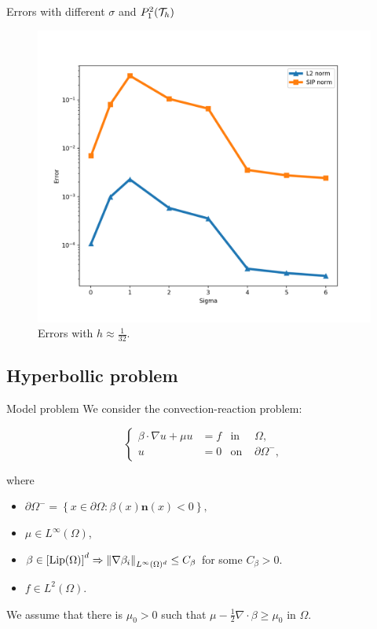 		\begin{frame}{Errors with different $\sigma$ and $\relax{P}_1^2(\mathcal{T}_h)$}
			\begin{figure}[h!]
				\centering
				\includegraphics[scale=0.37]{img/Difusion/errores_difusion_sigma.png}
				\caption{Errors with $h\approx\frac{1}{32}$.}
			\end{figure}
		\end{frame}

	\subsection{Hyperbollic problem}
	
	\begin{frame}{Model problem}
		We consider the convection-reaction problem:
		\begin{block}{}
		\begin{equation*}
		\left\{
		\begin{aligned}
		\beta\cdot\nabla u+\mu u&=f & \text{in } &\Omega, \\
		u&=0 & \text{on } &\partial\Omega^-,
		\end{aligned}
		\right.
		\end{equation*}
		\end{block}
		where 
		\begin{itemize}
			\item $\partial\Omega^-=\left\{x\in\partial\Omega\colon \beta(x)\mathbf{n}(x)<0\right\},$
			\item $\mu\in L^\infty(\Omega)$,
			\item $\beta\in\left[\text{Lip}(\Omega)\right]^d \Rightarrow \left\|\nabla\beta_i\right\|_{L^\infty(\Omega)^d}\le C_\beta$ for some $C_\beta >0$.
			\item $f\in L^2(\Omega)$.
		\end{itemize}
		\vspace*{.5cm}
		We assume that there is $\mu_0>0$ such that $\displaystyle\mu-\frac{1}{2}\nabla\cdot\beta\geq\mu_0$ in $\Omega$.
		
		\end{frame}

